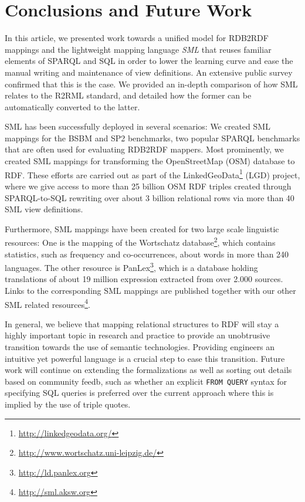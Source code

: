 \section{Conclusions and Future Work} %
\label{sec:conclusion}
In this article, we presented work towards a unified model for RDB2RDF mappings and the
lightweight mapping language \emph{SML} that reuses familiar elements of SPARQL
and SQL in order to lower the learning curve and ease the manual writing and maintenance of view definitions.
An extensive public survey confirmed that this is the case.
We provided an in-depth comparison of how SML relates to the R2RML standard, and
detailed how the former can be automatically converted to the latter.

SML has been successfully deployed in several scenarios:
We created SML mappings for the BSBM and SP2 benchmarks, two
popular SPARQL benchmarks that are often used for evaluating RDB2RDF
mappers.
Most prominently, we created SML mappings for transforming the
OpenStreetMap (OSM) database to RDF. These efforts are carried out
as part of the LinkedGeoData\footnote{\url{http://linkedgeodata.org/}} (LGD) project,
where we give access to more than 25 billion OSM RDF triples created through
SPARQL-to-SQL rewriting over about 3 billion relational rows via more than 40
SML view definitions.

Furthermore, SML mappings have been created for two large scale
linguistic resources: One is the mapping of the Wortschatz
database\footnote{\url{http://www.wortschatz.uni-leipzig.de/}}, which contains
statistics, such as frequency and co-occurrences, about words in more
than 240 languages.
The other resource is PanLex\footnote{\url{http://ld.panlex.org}}, which is
a database holding translations of about 19 million expression extracted from
over 2.000 sources. Links to the corresponding SML mappings are published
together with our other SML related
resources\footnote{\url{http://sml.aksw.org}}.

In general, we believe that mapping relational structures to RDF will stay a highly important topic in research and practice to provide an unobtrusive transition towards the use of semantic technologies.
Providing engineers an intuitive yet powerful language is a crucial step to ease this transition.
Future work will continue on extending the formalizations as well as sorting out details based on community feedb,
such as whether an explicit \texttt{FROM QUERY} syntax for specifying SQL queries is preferred over
the current approach where this is implied by the use of triple quotes.


